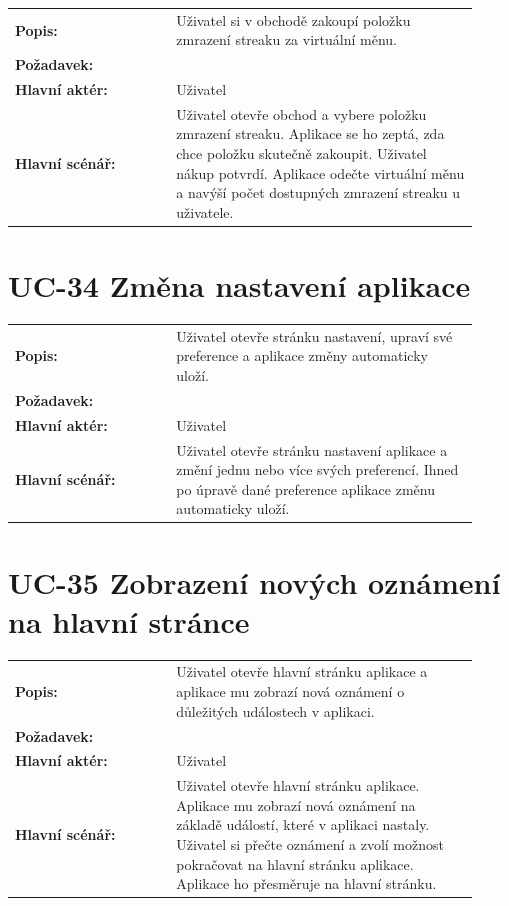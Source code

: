 \begin{tabular}{p{0.32\linewidth}p{0.6\linewidth}}
  \textbf{Popis:} & Uživatel si v obchodě zakoupí položku zmrazení streaku za virtuální měnu. \\
  \textbf{Požadavek:} & \nameref{sec:fp-streak-freeze} \\
  \textbf{Hlavní aktér:} & Uživatel \\
  \textbf{Hlavní scénář:} & Uživatel otevře obchod a vybere položku zmrazení streaku. Aplikace se ho zeptá, zda chce položku skutečně zakoupit. Uživatel nákup potvrdí. Aplikace odečte virtuální měnu a navýší počet dostupných zmrazení streaku u uživatele. \\
\end{tabular}

\section{UC-34 Změna nastavení aplikace}\label{sec:uc-34}

\begin{tabular}{p{0.32\linewidth}p{0.6\linewidth}}
  \textbf{Popis:} & Uživatel otevře stránku nastavení, upraví své preference a aplikace změny automaticky uloží. \\
  \textbf{Požadavek:} & \nameref{sec:fp-settings-page} \\
  \textbf{Hlavní aktér:} & Uživatel \\
  \textbf{Hlavní scénář:} & Uživatel otevře stránku nastavení aplikace a změní jednu nebo více svých preferencí. Ihned po úpravě dané preference aplikace změnu automaticky uloží. \\
\end{tabular}

\section{UC-35 Zobrazení nových oznámení na hlavní stránce}\label{sec:uc-35}

\begin{tabular}{p{0.32\linewidth}p{0.6\linewidth}}
  \textbf{Popis:} & Uživatel otevře hlavní stránku aplikace a aplikace mu zobrazí nová oznámení o důležitých událostech v aplikaci. \\
  \textbf{Požadavek:} & \nameref{sec:fp-extended-notifications} \\
  \textbf{Hlavní aktér:} & Uživatel \\
  \textbf{Hlavní scénář:} & Uživatel otevře hlavní stránku aplikace. Aplikace mu zobrazí nová oznámení na základě událostí, které v aplikaci nastaly. Uživatel si přečte oznámení a zvolí možnost pokračovat na hlavní stránku aplikace. Aplikace ho přesměruje na hlavní stránku. \\
\end{tabular}

